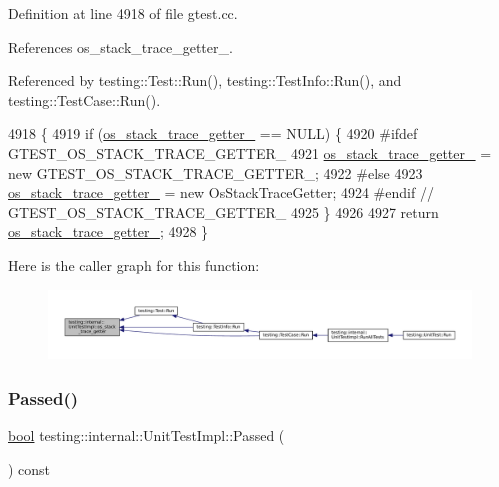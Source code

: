 Definition at line 4918 of file gtest.\+cc.



References os\+\_\+stack\+\_\+trace\+\_\+getter\+\_\+.



Referenced by testing\+::\+Test\+::\+Run(), testing\+::\+Test\+Info\+::\+Run(), and testing\+::\+Test\+Case\+::\+Run().


\begin{DoxyCode}
4918                                                                  \{
4919   \textcolor{keywordflow}{if} (\hyperlink{classtesting_1_1internal_1_1UnitTestImpl_a16b34d9194ca9552f581e472e9b18494}{os\_stack\_trace\_getter\_} == NULL) \{
4920 \textcolor{preprocessor}{#ifdef GTEST\_OS\_STACK\_TRACE\_GETTER\_}
4921     \hyperlink{classtesting_1_1internal_1_1UnitTestImpl_a16b34d9194ca9552f581e472e9b18494}{os\_stack\_trace\_getter\_} = \textcolor{keyword}{new} GTEST\_OS\_STACK\_TRACE\_GETTER\_;
4922 \textcolor{preprocessor}{#else}
4923     \hyperlink{classtesting_1_1internal_1_1UnitTestImpl_a16b34d9194ca9552f581e472e9b18494}{os\_stack\_trace\_getter\_} = \textcolor{keyword}{new} OsStackTraceGetter;
4924 \textcolor{preprocessor}{#endif  // GTEST\_OS\_STACK\_TRACE\_GETTER\_}
4925   \}
4926 
4927   \textcolor{keywordflow}{return} \hyperlink{classtesting_1_1internal_1_1UnitTestImpl_a16b34d9194ca9552f581e472e9b18494}{os\_stack\_trace\_getter\_};
4928 \}
\end{DoxyCode}
Here is the caller graph for this function\+:
\nopagebreak
\begin{figure}[H]
\begin{center}
\leavevmode
\includegraphics[width=350pt]{classtesting_1_1internal_1_1UnitTestImpl_a71753679854f7fbba6c1568eb422fecb_icgraph}
\end{center}
\end{figure}
\mbox{\label{classtesting_1_1internal_1_1UnitTestImpl_ae8e461369acfec902da382bc02297fe5}} 
\subsubsection{\texorpdfstring{Passed()}{Passed()}}
{\footnotesize\ttfamily \hyperlink{classbool}{bool} testing\+::internal\+::\+Unit\+Test\+Impl\+::\+Passed (\begin{DoxyParamCaption}{ }\end{DoxyParamCaption}) const\hspace{0.3cm}{\ttfamily [inline]}}



